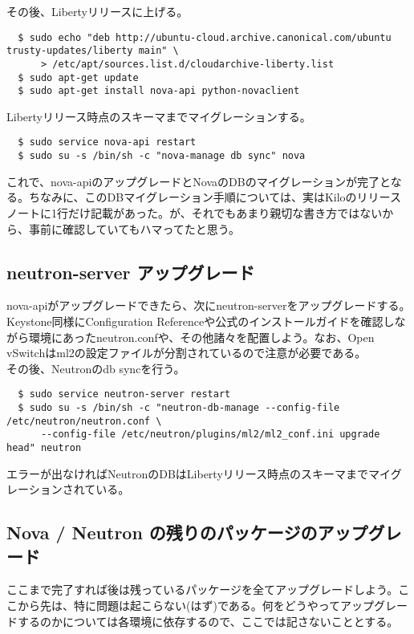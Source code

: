 \documentclass[9pt,b5paper,tombo,openany]{jsbook}
\begin{document}
\noindent
その後、Libertyリリースに上げる。
\begin{lstlisting}
  $ sudo echo "deb http://ubuntu-cloud.archive.canonical.com/ubuntu trusty-updates/liberty main" \
      > /etc/apt/sources.list.d/cloudarchive-liberty.list
  $ sudo apt-get update
  $ sudo apt-get install nova-api python-novaclient
\end{lstlisting}

\noindent
Libertyリリース時点のスキーマまでマイグレーションする。
\begin{lstlisting}
  $ sudo service nova-api restart
  $ sudo su -s /bin/sh -c "nova-manage db sync" nova
\end{lstlisting}

これで、nova-apiのアップグレードとNovaのDBのマイグレーションが完了となる。ちなみに、このDBマイグレーション手順については、実はKiloのリリースノートに1行だけ記載があった。が、それでもあまり親切な書き方ではないから、事前に確認していてもハマってたと思う。

\subsection{neutron-server アップグレード}
\noindent
nova-apiがアップグレードできたら、次にneutron-serverをアップグレードする。\\[1ex]

Keystone同様にConfiguration Referenceや公式のインストールガイドを確認しながら環境にあったneutron.confや、その他諸々を配置しよう。なお、Open vSwitchはml2の設定ファイルが分割されているので注意が必要である。\\[1ex]

\noindent
その後、Neutronのdb syncを行う。
\begin{lstlisting}
  $ sudo service neutron-server restart
  $ sudo su -s /bin/sh -c "neutron-db-manage --config-file /etc/neutron/neutron.conf \
      --config-file /etc/neutron/plugins/ml2/ml2_conf.ini upgrade head" neutron
\end{lstlisting}

\noindent
エラーが出なければNeutronのDBはLibertyリリース時点のスキーマまでマイグレーションされている。

\subsection{Nova / Neutron の残りのパッケージのアップグレード}
ここまで完了すれば後は残っているパッケージを全てアップグレードしよう。ここから先は、特に問題は起こらない(はず)である。何をどうやってアップグレードするのかについては各環境に依存するので、ここでは記さないこととする。
\end{document}
